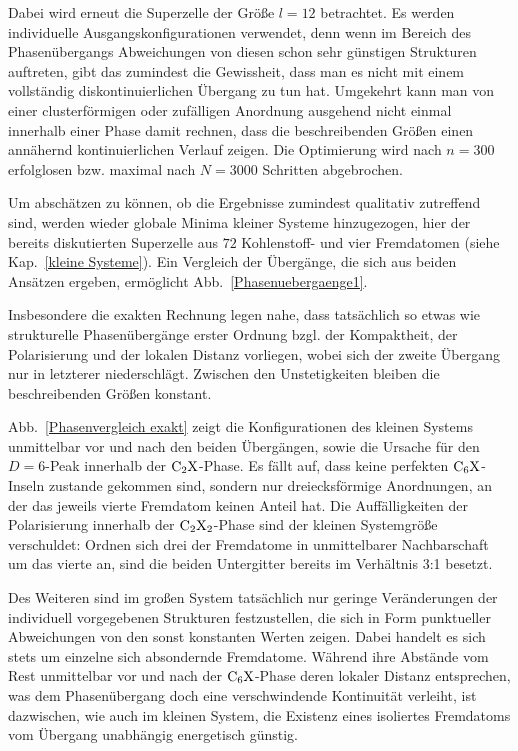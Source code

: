 \documentclass[a4paper, 10pt, twoside, openany]{book} %
\begin{document}
	Dabei wird erneut die Superzelle der Größe $l = 12$ betrachtet. Es werden individuelle Ausgangskonfigurationen verwendet, denn wenn im Bereich des Phasenübergangs Abweichungen von diesen schon sehr günstigen Strukturen auftreten, gibt das zumindest die Gewissheit, dass man es nicht mit einem vollständig diskontinuierlichen Übergang zu tun hat. Umgekehrt kann man von einer clusterförmigen oder zufälligen Anordnung ausgehend nicht einmal innerhalb einer Phase damit rechnen, dass die beschreibenden Größen einen annähernd kontinuierlichen Verlauf zeigen. Die Optimierung wird nach $n = 300$ erfolglosen bzw. maximal nach $N = 3000$ Schritten abgebrochen.
	
	Um abschätzen zu können, ob die Ergebnisse zumindest qualitativ zutreffend sind, werden wieder globale Minima kleiner Systeme hinzugezogen, hier der bereits diskutierten Superzelle aus $72$ Kohlenstoff- und vier Fremdatomen (siehe Kap.~\ref{kleine Systeme}). Ein Vergleich der Übergänge, die sich aus beiden Ansätzen ergeben, ermöglicht Abb.~\ref{Phasenuebergaenge1}.
	
	Insbesondere die exakten Rechnung legen nahe, dass tatsächlich so etwas wie strukturelle Phasenübergänge erster Ordnung bzgl. der Kompaktheit, der Polarisierung und der lokalen Distanz vorliegen, wobei sich der zweite Übergang nur in letzterer niederschlägt. Zwischen den Unstetigkeiten bleiben die beschreibenden Größen konstant.
	
	Abb.~\ref{Phasenvergleich exakt} zeigt die Konfigurationen des kleinen Systems unmittelbar vor und nach den beiden Übergängen, sowie die Ursache für den $D = 6$-Peak innerhalb der $\rm C_2X$-Phase. Es fällt auf, dass keine perfekten $\rm C_6X$-Inseln zustande gekommen sind, sondern nur dreiecksförmige Anordnungen, an der das jeweils vierte Fremdatom keinen Anteil hat. Die Auffälligkeiten der Polarisierung innerhalb der $\rm C_2X_2$-Phase sind der kleinen Systemgröße verschuldet: Ordnen sich drei der Fremdatome in unmittelbarer Nachbarschaft um das vierte an, sind die beiden Untergitter bereits im Verhältnis 3:1 besetzt.
	
	Des Weiteren sind im großen System tatsächlich nur geringe Veränderungen der individuell vorgegebenen Strukturen festzustellen, die sich in Form punktueller Abweichungen von den sonst konstanten Werten zeigen. Dabei handelt es sich stets um einzelne sich absondernde Fremdatome. Während ihre Abstände vom Rest unmittelbar vor und nach der $\rm C_6X$-Phase deren lokaler Distanz entsprechen, was dem Phasenübergang doch eine verschwindende Kontinuität verleiht, ist dazwischen, wie auch im kleinen System, die Existenz eines isoliertes Fremdatoms vom Übergang unabhängig energetisch günstig.
	
\end{document}
